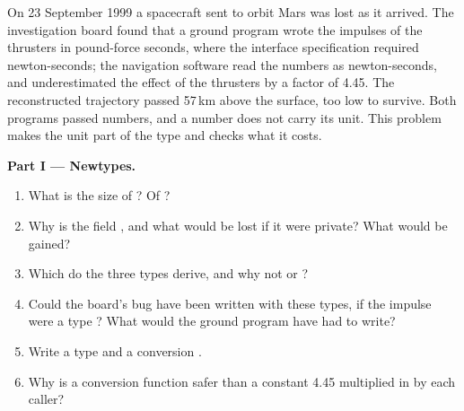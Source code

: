 \begin{problem}\label{pb:b2:rust-traits-and-generics:1}
On 23 September 1999 a spacecraft sent to orbit Mars was lost as it arrived. The investigation board found that a
ground program wrote the impulses of the thrusters in pound-force seconds, where the interface specification required
newton-seconds; the navigation software read the numbers as newton-seconds, and underestimated the effect of the
thrusters by a factor of 4.45. The reconstructed trajectory passed 57\,km above the surface, too low to survive. Both
programs passed numbers, and a number does not carry its unit. This problem makes the unit part of the type and
checks what it costs.

\medskip\noindent\textbf{Part I --- Newtypes.}\par\nopagebreak
{}
\begin{enumerate}[beginpenalty=10000]
\item What is the size of ? Of ?
\item Why is the field , and what would be lost if it were private? What would be gained?
\item Which  do the three types derive, and why not  or ?
\item Could the board's bug have been written with these types, if the impulse were a type ?
What would the ground program have had to write?
\item Write a type  and a conversion .
\item Why is a conversion function safer than a constant 4.45 multiplied in by each caller?
\end{enumerate}


\end{problem}
